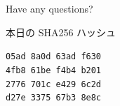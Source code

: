 \documentclass[cjk,dvipdfmx,12pt,compress]{beamer}
\begin{document}
\begin{frame}
  \begin{center}
    {\Huge{Have any questions?}}
  \end{center}
\end{frame}

\begin{frame}{本日の SHA256 ハッシュ}
  \begin{center}
    {\Huge{
        \texttt{05ad 8a0d 63ad f630}\\%
        \texttt{4fb8 61be f4b4 b201}\\%
        \texttt{2776 701c e429 6c2d}\\%
        \texttt{d27e 3375 67b3 8e8c}\\%
      }}
  \end{center}
\end{frame}
\end{document}
